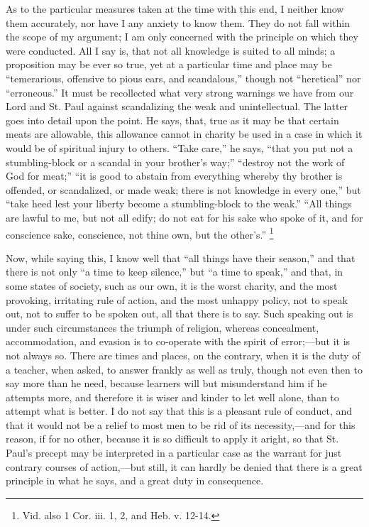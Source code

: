 As to the particular measures taken at the time with this end, I
neither know them accurately, nor have I any anxiety to know them.
They do not fall within the scope of my argument; I am only concerned
with the principle on which they were conducted. All I say is, that
not all knowledge is suited to all minds; a proposition may be ever so
true, yet at a particular time and place may be ``temerarious,
offensive to pious ears, and scandalous,'' though not
``heretical'' nor ``erroneous.'' It must be
recollected what very strong warnings we have from our Lord and St.
Paul against scandalizing the weak and unintellectual. The
latter goes into detail upon the point. He says, that, true as it may
be that certain meats are allowable, this allowance cannot in charity
be used in a case in which it would be of spiritual injury to others.
``Take care,'' he says, ``that you put not a
stumbling-block or a scandal in your brother's way;''
``destroy not the work of God for meat;'' ``it is good to
abstain from everything whereby thy brother is offended, or
scandalized, or made weak; there is not knowledge in every one,''
but ``take heed lest your liberty become a stumbling-block to the
weak.'' ``All things are lawful to me, but not all edify; do
not eat for his sake who spoke of it, and for conscience sake,
conscience, not thine own, but the other's.'' \footnote{Vid. also 1 Cor. iii. 1, 2, and Heb. v.
12-14.}

Now, while saying this, I know well that ``all things have
their season,'' and that there is not only ``a time to keep
silence,'' but ``a time to speak,'' and that, in some
states of society, such as our own, it is the worst charity, and the
most provoking, irritating rule of action, and the most unhappy
policy, not to speak out, not to suffer to be spoken out, all that
there is to say. Such speaking out is under such circumstances the
triumph of religion, whereas concealment, accommodation, and evasion
is to co-operate with the spirit of error;—but it is not always so.
There are times and places, on the contrary, when it is the duty of a
teacher, when asked, to answer frankly as well as truly,
though not even then to say more than he need, because learners will
but misunderstand him if he attempts more, and therefore it is wiser
and kinder to let well alone, than to attempt what is better. I do not
say that this is a pleasant rule of conduct, and that it would not be
a relief to most men to be rid of its necessity,—and for this
reason, if for no other, because it is so difficult to apply it
aright, so that St. Paul's precept may be interpreted in a particular
case as the warrant for just contrary courses of action,—but still,
it can hardly be denied that there is a great principle in what he
says, and a great duty in consequence.

